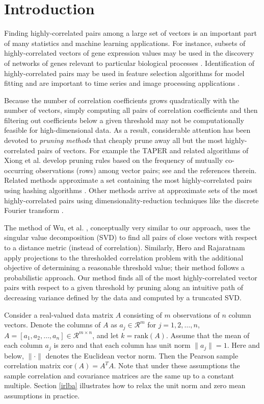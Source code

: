 \documentclass{article}
\numberwithin{algorithmctr}{section}
\begin{document}
\section{Introduction}\label{intro}

Finding highly-correlated pairs among a large set of vectors is an important part 
of many statistics and machine learning applications. For instance, subsets of 
highly-correlated vectors of gene expression values may be used in the discovery 
of networks of genes relevant to particular biological processes \cite{genomics}. 
Identification of highly-correlated pairs may be used in feature selection 
algorithms for model fitting \cite{ml1, ml2} and are important to time series and 
image processing applications \cite{timeseries, svd-similarity}.

Because the number of correlation coefficients grows quadratically with the 
number of vectors, simply computing all pairs of correlation coefficients and 
then filtering out coefficients below a given threshold may not be 
computationally feasible for high-dimensional data. As a result, 
considerable attention has been devoted to \emph{pruning methods} that cheaply 
prune away all but the most highly-correlated pairs of vectors.  For example the 
TAPER and related algorithms of Xiong et al. develop pruning rules based on the 
frequency of mutually co-occurring observations (rows) among vector pairs; see 
\cite{prune1, prune2} and the references therein.  Related methods approximate a 
set containing the most highly-correlated pairs using hashing algorithms 
\cite{prune3}. Other methods arrive at approximate sets of the most 
highly-correlated pairs using dimensionality-reduction techniques like the 
discrete Fourier transform \cite{timeseries}. 

The method of Wu, et al. \cite{svd-similarity}, conceptually very similar to our 
approach, uses the singular value decomposition (SVD) to find all pairs of close 
vectors with respect to a distance metric (instead of correlation). Similarly, 
Hero and Rajaratnam\cite{hero2011large} apply projections to the thresholded 
correlation problem with the additional objective of determining a reasonable 
threshold value; their method follows a probabilistic approach.  Our method finds 
all of the most highly-correlated vector pairs with respect to a given threshold 
by pruning along an intuitive path of decreasing variance defined by the data and
computed by a truncated SVD.

Consider a real-valued data matrix $A$ consisting of $m$ observations of $n$
column vectors.  Denote the columns of $A$ as $a_j\in\mathcal{R}^m$ for
$j=1,2,\ldots,n$, $A=[a_1, a_2, \ldots, a_n]\in\mathcal{R}^{m\times n}$, and
let $k=\mathrm{rank}(A)$.  Assume that the mean of each column $a_j$ is zero
and that each column has unit norm $\|a_j\| = 1$. Here and below, $\|\cdot\|$
denotes the Euclidean vector norm. Then the Pearson sample correlation matrix
$\mathrm{cor}(A)=A^TA$.  Note that under these assumptions the sample
correlation and covariance matrices are the same up to a constant multiple.
Section \ref{irlba} illustrates how to relax the unit norm and zero mean
assumptions in practice.
\end{document}
